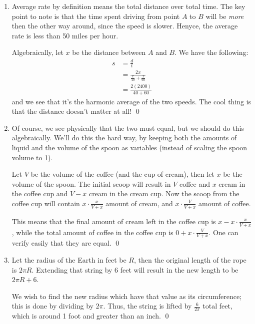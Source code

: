 \begin{Exercise}
	\begin{enumerate}
		\item Average rate by definition means the total distance over total time. 
		The key point to note is that the time spent driving from point $A$ to $B$ will be \emph{more} then the other way around, 
		since the speed is slower. 
		Henyce, the average rate is less than 50 miles per hour. 

		Algebraically, let $x$ be the distance between $A$ and $B$.
		We have the following:
		\begin{align}
			s &= \frac{d}{t} \\
			&= \frac{2x}{\frac{x}{40} + \frac{x}{60}} \\
			&= \frac{2(2400)}{40 + 60}
		\end{align}
		and we see that it's the harmonic average of the two speeds. 
		The cool thing is that the distance doesn't matter at all! \qed

		\item Of course, we see physically that the two must equal, but we should do this algebraically.
		We'll do this the hard way, by keeping both the amounts of liquid and the volume of the spoon as variables (instead of scaling the spoon volume to 1).

		Let $V$ be the volume of the coffee (and the cup of cream), then let $x$ be the volume of the spoon. 
		The initial scoop will result in $V$ coffee and $x$ cream in the coffee cup and $V-x$ cream in the cream cup.
		Now the scoop from the coffee cup will contain $x \cdot \frac{x}{V+x}$  amount of cream, and $x \cdot \frac{V}{V+x}$ amount of coffee.

		This means that the final amount of cream left in the coffee cup is $x - x\cdot \frac{x}{V+x}$, while the total amount of 
		coffee in the coffee cup is $0 + x\cdot \frac{V}{V+x}$. 
		One can verify easily that they are equal. \qed

		\item Let the radius of the Earth in feet be $R$, then the original length of the rope is $2\pi R$.
		Extending that string by 6 feet will result in the new length to be $2\pi R + 6$. 

		We wish to find the new radius which have that value as its circumference; this is done by dividing by $2\pi$.
		Thus, the string is lifted by $\frac{6}{2\pi}$ total feet, which is around 1 foot and greater than an inch. \qed
	\end{enumerate}
\end{Exercise}

